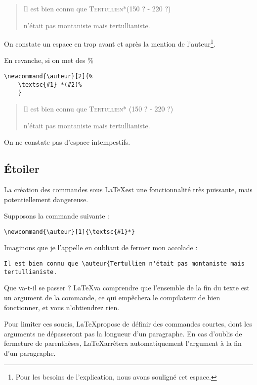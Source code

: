 \renewcommand{\auteur}[2]{\underline{ }%
	\textsc{#1}*(#2)\underline{ }%
}

\begin{quotation}
Il est bien connu que \auteur{Tertullien}{150 ? - 220 ?}
n'était pas montaniste mais tertullianiste.
\end{quotation}

On constate un espace en trop avant et après la mention de l'auteur\footnote{Pour les besoins de l'explication, nous avons souligné cet espace.}.

En revanche, si on met des \% 

\begin{verbatim}
\newcommand{\auteur}[2]{%
	\textsc{#1} *(#2)%
	}
\end{verbatim}

\renewcommand{\auteur}[2]{%
	\textsc{#1}* (#2)%
}

\begin{quotation}
Il est bien connu que \auteur{Tertullien}{150 ? - 220 ?}
n'était pas montaniste mais tertullianiste.
\end{quotation}

On ne constate pas d'espace intempestifs.


\subsection[Étoiler newcommand]{Étoiler }

La création des commandes sous \LaTeX est une fonctionnalité très puissante, mais potentiellement dangereuse.

Supposons la commande suivante :

\begin{verbatim}
\newcommand{\auteur}[1]{\textsc{#1}*}
\end{verbatim}

Imaginons que je l'appelle en oubliant de fermer mon accolade :

\begin{verbatim}
Il est bien connu que \auteur{Tertullien n'était pas montaniste mais tertullianiste.
\end{verbatim}

Que va-t-il se passer ? \LaTeX va comprendre que l'ensemble de la fin du texte est un argument de la commande, ce qui empêchera le compilateur de bien fonctionner, et vous n'obtiendrez rien.

Pour limiter ces soucis, \LaTeX propose de définir des commandes courtes, dont les arguments ne dépasseront pas la longueur d'un paragraphe. En cas d'oublis de fermeture de parenthèses, \LaTeX arrêtera automatiquement l'argument à la fin d'un paragraphe.

